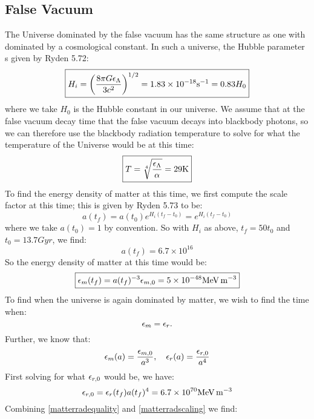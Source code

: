 \subsection{False Vacuum}
The Universe dominated by the false vacuum has the same structure as one with dominated by a cosmological constant. In such a universe, the Hubble parameter s given by Ryden 5.72:
\begin{equation}
    \boxed{H_i = \left(\frac{8\pi G\e_{\Lambda}}{3c^2}\right)^{1/2} = 1.83 \times 10^{-18}\si{s^{-1}} = 0.83H_0}
\end{equation}
where we take $H_0$ is the Hubble constant in our universe. We assume that at the false vacuum decay time that the false vacuum decays into blackbody photons, so we can therefore use the blackbody radiation temperature to solve for what the temperature of the Universe would be at this time:
\begin{equation}
    \boxed{T = \sqrt[4]{\frac{\e_{\Lambda}}{\alpha}} = 29\si{K}}
\end{equation}
To find the energy density of matter at this time, we first compute the scale factor at this time; this is given by Ryden 5.73 to be:
\begin{equation}
    a(t_f) = a(t_0)e^{H_i(t_f - t_0)} = e^{H_i(t_f - t_0)} 
\end{equation}
where we take $a(t_0) = 1$ by convention. So with $H_i$ as above, $t_f = 50t_0$ and $t_0 = 13.7\si{Gyr}$, we find:
\begin{equation}
    a(t_f) = 6.7 \times 10^{16}
\end{equation}
So the energy density of matter at this time would be:
\begin{equation}
    \boxed{\e_{m}(t_f) = a(t_f)^{-3} \e_{m, 0} = 5 \times 10^{-48}\si{MeV.m^{-3}}}
\end{equation}
To find when the universe is again dominated by matter, we wish to find the time when:
\begin{equation}\label{matterradequality}
    \e_{m} = \e_r.
\end{equation}
Further, we know that:
\begin{equation}\label{matterradscaling}
    \e_m(a) = \frac{\e_{m, 0}}{a^3}, \quad \e_{r}(a) = \frac{\e_{r, 0}}{a^4}
\end{equation}
First solving for what $\e_{r, 0}$ would be, we have:
\begin{equation}
    \e_{r, 0} = \e_{r}(t_f)a(t_f)^4 = 6.7 \times 10^{70}\si{MeV.m^{-3}}
\end{equation}
Combining \eqref{matterradequality} and \eqref{matterradscaling} we find:
